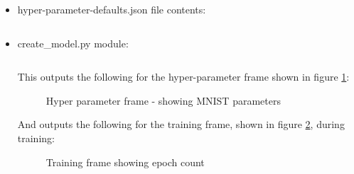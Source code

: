 \documentclass[./project-report/src/latex/project-report.tex]{subfiles}
\begin{document}
\begin{itemize}
    \item hyper-parameter-defaults.json file contents:
        \inputminted{json}{./school_project/frames/hyper-parameter-defaults.json}
    \item create\_model.py module:
        \label{sec:create_model-module}
        \inputminted{python}{./school_project/frames/create_model.py}
        
        This outputs the following for the hyper-parameter frame shown in figure \ref{fig:hyper-parameter-frame}:

        \pagebreak
        
        \begin{figure}[h!]
        \centering
		\caption{Hyper parameter frame - showing MNIST parameters}
        \label{fig:hyper-parameter-frame}
        \end{figure}

        And outputs the following for the training frame, shown in figure \ref{fig:training-frame-1-impl}, during training:

        \begin{figure}[h!]
        \centering
        \caption{Training frame showing epoch count}
        \label{fig:training-frame-1-impl}
        \end{figure}


\end{itemize}
\end{document}
